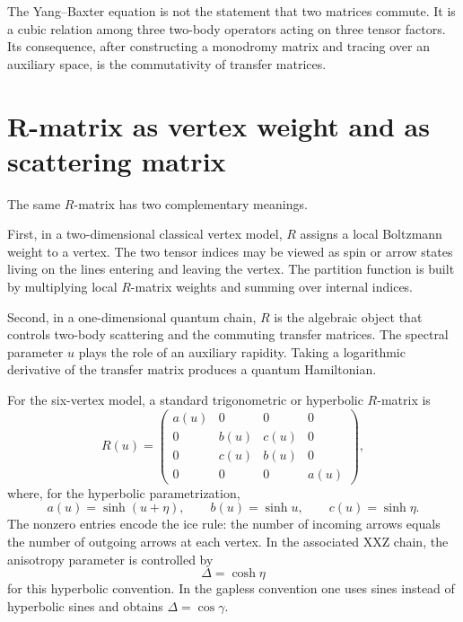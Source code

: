\begin{remark}
The Yang--Baxter equation is not the statement that two matrices commute.  It is
a cubic relation among three two-body operators acting on three tensor factors.
Its consequence, after constructing a monodromy matrix and tracing over an
auxiliary space, is the commutativity of transfer matrices.
\end{remark}

\section{R-matrix as vertex weight and as scattering matrix}
\label{sec:r-matrix-two-interpretations}

The same $R$-matrix has two complementary meanings.

First, in a two-dimensional classical vertex model, $R$ assigns a local Boltzmann
weight to a vertex.  The two tensor indices may be viewed as spin or arrow states
living on the lines entering and leaving the vertex.  The partition function is
built by multiplying local $R$-matrix weights and summing over internal indices.

Second, in a one-dimensional quantum chain, $R$ is the algebraic object that
controls two-body scattering and the commuting transfer matrices.  The spectral
parameter $u$ plays the role of an auxiliary rapidity.  Taking a logarithmic
derivative of the transfer matrix produces a quantum Hamiltonian.

For the six-vertex model, a standard trigonometric or hyperbolic $R$-matrix is
\begin{equation}
\label{eq:six-vertex-R-preview}
    R(u)=
    \begin{pmatrix}
    a(u)&0&0&0\\
    0&b(u)&c(u)&0\\
    0&c(u)&b(u)&0\\
    0&0&0&a(u)
    \end{pmatrix},
\end{equation}
where, for the hyperbolic parametrization,
\begin{equation}
\label{eq:six-vertex-weights-hyperbolic-preview}
    a(u)=\sinh(u+\eta),
    \qquad
    b(u)=\sinh u,
    \qquad
    c(u)=\sinh\eta .
\end{equation}
The nonzero entries encode the ice rule: the number of incoming arrows equals the
number of outgoing arrows at each vertex.  In the associated XXZ chain, the
anisotropy parameter is controlled by
\begin{equation}
\label{eq:xxz-anisotropy-preview}
    \Delta=\cosh\eta
\end{equation}
for this hyperbolic convention.  In the gapless convention one uses sines instead
of hyperbolic sines and obtains $\Delta=\cos\gamma$.

